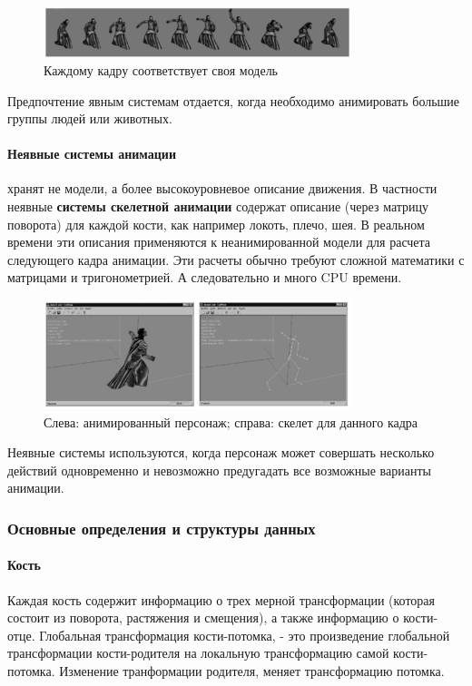 \begin{figure}[h!]
    \centering
    \includegraphics[width=0.8\textwidth]{explicit_animation.png}
    \caption{Каждому кадру соответствует своя модель}
\end{figure}

Предпочтение явным системам отдается, когда необходимо анимировать большие группы людей или животных.

\paragraph{Неявные системы анимации} хранят не модели, а более высокоуровневое описание движения.
В частности неявные \textbf{системы скелетной анимации} содержат описание (через матрицу поворота) для каждой кости, как например локоть, плечо, шея.
В реальном времени эти описания применяются к неанимированной модели для расчета следующего кадра анимации.
Эти расчеты обычно требуют сложной математики с матрицами и тригонометрией.
А следовательно и много CPU времени.


\begin{figure}[h!]
    \centering
    \includegraphics[width=0.8\textwidth]{implicit_animation.png}
    \caption{\small{Слева: анимированный персонаж; справа: скелет для данного кадра}}
\end{figure}

Неявные системы используются, когда персонаж может совершать несколько действий одновременно и невозможно предугадать все возможные варианты анимации.

\subsubsection{Основные определения и структуры данных}

\paragraph{Кость}
Каждая кость содержит информацию о трех мерной трансформации (которая состоит из поворота, растяжения и смещения), а также информацию о кости-отце. Глобальная трансформация кости-потомка, - это произведение глобальной трансформации кости-родителя на локальную трансформацию самой кости-потомка. Изменение транформации родителя, меняет трансформацию потомка.

